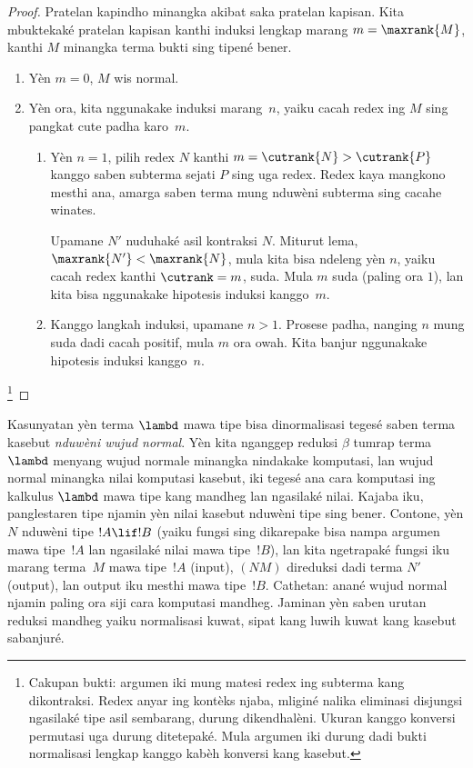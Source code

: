 \documentclass[../../../include/open-logic-section]{subfiles}
\begin{document}
\begin{proof}
  Pratelan kapindho minangka akibat saka pratelan kapisan. Kita mbuktekaké
  pratelan kapisan kanthi induksi lengkap marang $m=\maxrank{M}$,
  kanthi $M$ minangka terma bukti sing tipené bener.
  \begin{enumerate}

  \item Yèn $m=0$, $M$ wis normal.
  \item
    Yèn ora, kita nggunakake induksi marang~$n$, yaiku cacah redex
    ing $M$ sing pangkat cute padha karo~$m$.
    \begin{enumerate}
    \item Yèn $n=1$, pilih redex $N$ kanthi $m = \cutrank{N} >
      \cutrank{P}$ kanggo saben subterma sejati $P$ sing uga redex.
      Redex kaya mangkono mesthi ana, amarga saben terma mung nduwèni
      subterma sing cacahe winates.

      Upamane $N'$ nuduhaké asil kontraksi $N$. Miturut lema,
      $\maxrank{N'} < \maxrank{N}$, mula kita bisa ndeleng yèn $n$,
      yaiku cacah redex kanthi $\cutrank=m$, suda. Mula $m$ suda
      (paling ora $1$), lan kita bisa nggunakake hipotesis induksi
      kanggo~$m$.
    \item Kanggo langkah induksi, upamane $n>1$. Prosese padha,
      nanging $n$ mung suda dadi cacah positif, mula $m$ ora owah.
      Kita banjur nggunakake hipotesis induksi kanggo~$n$.
    \end{enumerate}
\end{enumerate}
\footnote{Cakupan bukti: argumen iki mung matesi redex ing subterma kang dikontraksi. Redex anyar ing kontèks njaba, mliginé nalika eliminasi disjungsi ngasilaké tipe asil sembarang, durung dikendhalèni. Ukuran kanggo konversi permutasi uga durung ditetepaké. Mula argumen iki durung dadi bukti normalisasi lengkap kanggo kabèh konversi kang kasebut.}
\end{proof}

Kasunyatan yèn terma $\lambd$ mawa tipe bisa dinormalisasi tegesé saben
terma kasebut \emph{nduwèni wujud normal}. Yèn kita nganggep reduksi
$\beta$ tumrap terma $\lambd$ menyang wujud normale minangka nindakake
komputasi, lan wujud normal minangka nilai komputasi kasebut, iki tegesé
ana cara komputasi ing kalkulus $\lambd$ mawa tipe kang mandheg lan
ngasilaké nilai. Kajaba iku, panglestaren tipe njamin yèn nilai kasebut
nduwèni tipe sing bener. Contone, yèn $N$ nduwèni tipe $!A \lif !B$
(yaiku fungsi sing dikarepake bisa nampa argumen mawa tipe~$!A$ lan
ngasilaké nilai mawa tipe~$!B$), lan kita ngetrapaké fungsi iku marang
terma~$M$ mawa tipe~$!A$ (input), $(NM)$ direduksi dadi terma $N'$
(output), lan output iku mesthi mawa tipe~$!B$.
Cathetan: anané wujud normal njamin paling ora siji cara komputasi mandheg. Jaminan yèn saben urutan reduksi mandheg yaiku normalisasi kuwat, sipat kang luwih kuwat kang kasebut sabanjuré.
\end{document}
